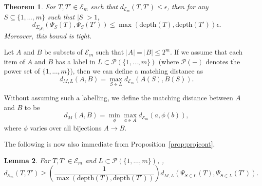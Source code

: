 \documentclass[a4paper,11pt]{article}
\newtheorem{theorem}{Theorem}[section]
\newtheorem{lemma}[theorem]{Lemma}
\newcommand{\aE}{\mathcal{E}}
\newcommand{\aP}{\mathcal{P}}
\newcommand{\depth}{\textrm{depth}}
\begin{document}
\begin{theorem}\label{thm:stab}
For $T,T' \in \aE_m$ such that $d_{\aE_m}(T,T') \leq \epsilon$, then for any $S \subseteq \{1,\ldots,m\}$ such that $|S| > 1$, 
\[
d_{\Sigma_{|S|}}(\Psi_S(T), \Psi_S(T')) \leq \max(\depth(T),\depth(T')) \epsilon.
\]
Moreover, this bound is tight.
\end{theorem}

Let $A$ and $B$ be subsets of $\aE_m$ such that $|A| = |B| \leq 2^m$.
If we assume that each item of $A$ and $B$ has a label in $L \subset \aP(\{1,\ldots,m\})$ (where $\aP(-)$ denotes the power set of $\{1,\ldots,m\}$), then we can define a matching distance as
\[
d_{M,L}(A,B) = \max_{S \in L} d_{\aE_m}(A(S), B(S)).
\]

Without assuming such a labelling, we define the matching distance between $A$ and $B$ to be 
\[
d_M(A,B) = \min_{\phi} \max_{a \in A} d_{\aE_m}(a,\phi(b)),
\]
where $\phi$ varies over all bijections $A \to B$.

The following is now also immediate from Proposition~\ref{prop:projcont}.

\begin{lemma}\label{lem:converse}
For $T, T' \in \aE_m$ and $L \subset \aP(\{1,\ldots,m\})$, , 
\[
d_{\aE_m}(T,T') \geq \left(\frac{1}{\max(\depth(T), \depth(T'))}\right) d_{M,L}(\Psi_{S \in L}(T), \Psi_{S \in L}(T')).
\]
\end{lemma}
\end{document}
